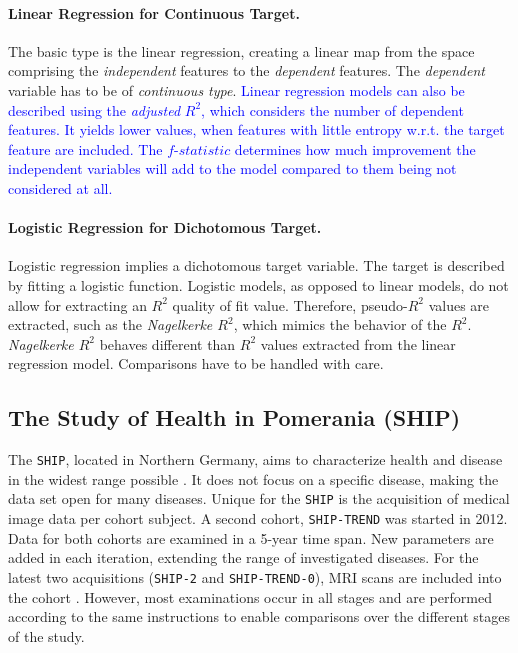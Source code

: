 \documentclass[journal]{style/vgtc} 			          %
\newcommand{\add}[1]{\textcolor{blue}{#1}}
\begin{document}
\paragraph{Linear Regression for Continuous Target.}
The basic type is the linear regression, creating a linear map from the space comprising the \emph{independent} features to the \emph{dependent} features.
The \emph{dependent} variable has to be of \emph{continuous type}.
\add{
Linear regression models can also be described using the \emph{adjusted} $R^2$, which considers the number of dependent features.
It yields lower values, when features with little entropy w.r.t. the target feature are included.
The $f$-$statistic$ determines how much improvement the independent variables will add to the model compared to them being not considered at all.
}

\paragraph{Logistic Regression for Dichotomous Target.} Logistic regression implies a dichotomous target variable.
The target is described by fitting a logistic function.
Logistic models, as opposed to linear models, do not allow for extracting an $R^2$ quality of fit value.
Therefore, pseudo-$R^2$ values are extracted, such as the \emph{Nagelkerke $R^2$}, which mimics the behavior of the $R^2$.
\emph{Nagelkerke $R^2$} behaves different than $R^2$ values extracted from the linear regression model.
Comparisons have to be handled with care.
\subsection{The Study of Health in Pomerania (SHIP)}
The \texttt{SHIP}, located in Northern Germany, aims to characterize health and disease in the widest range possible \cite{Volzke2011}.
It does not focus on a specific disease, making the data set open for many diseases.
Unique for the \texttt{SHIP} is the acquisition of medical image data per cohort subject.
A second cohort, \texttt{SHIP-TREND} was started in 2012.
Data for both cohorts are examined in a 5-year time span.
New parameters are added in each iteration, extending the range of investigated diseases.
For the latest two acquisitions (\texttt{SHIP-2} and \texttt{SHIP-TREND-0}), MRI scans are included into the cohort \cite{Hegenscheid2009, Ivanovska2014}.
However, most examinations occur in all stages and are performed according to the same instructions to enable comparisons over the different stages of the study.
\end{document}

